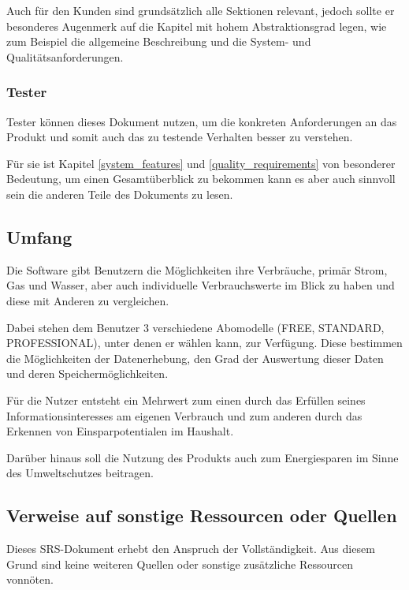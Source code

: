 Auch für den Kunden sind grundsätzlich alle Sektionen relevant,
jedoch sollte er besonderes Augenmerk auf die Kapitel mit hohem Abstraktionsgrad legen,
wie zum Beispiel die allgemeine Beschreibung und die System- und Qualitätsanforderungen. %

\subsubsection{Tester}

Tester können dieses Dokument nutzen, um die konkreten Anforderungen an das Produkt
und somit auch das zu testende Verhalten besser zu verstehen.

Für sie ist Kapitel \ref{system_features} und \ref{quality_requirements} von besonderer Bedeutung,
um einen Gesamtüberblick zu bekommen kann es aber auch sinnvoll sein die anderen Teile des Dokuments zu lesen.

\subsection{Umfang}

Die Software gibt Benutzern die Möglichkeiten ihre Verbräuche, primär Strom, Gas und Wasser,
aber auch individuelle Verbrauchswerte im Blick zu haben und diese mit Anderen zu vergleichen.


Dabei stehen dem Benutzer 3 verschiedene Abomodelle (FREE, STANDARD, PROFESSIONAL),
unter denen er wählen kann, zur Verfügung.
Diese bestimmen die Möglichkeiten der Datenerhebung,
den Grad der Auswertung dieser Daten und deren Speichermöglichkeiten.

Für die Nutzer entsteht ein Mehrwert zum einen durch das Erfüllen seines Informationsinteresses am eigenen Verbrauch
und zum anderen durch das Erkennen von Einsparpotentialen im Haushalt.

Darüber hinaus soll die Nutzung des Produkts auch zum Energiesparen im Sinne des Umweltschutzes beitragen.

\subsection{Verweise auf sonstige Ressourcen oder Quellen}

Dieses SRS-Dokument erhebt den Anspruch der Vollständigkeit.
Aus diesem Grund sind keine weiteren Quellen oder sonstige zusätzliche Ressourcen vonnöten.
